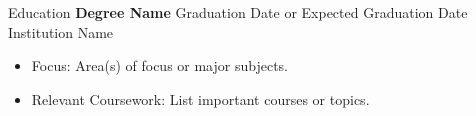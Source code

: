 \begin{rSection}{Education}
  \textbf{Degree Name} \hfill Graduation Date or Expected Graduation Date \\
  Institution Name
  \begin{itemize}
      \item Focus: Area(s) of focus or major subjects.
      \item Relevant Coursework: List important courses or topics.
  \end{itemize}
\end{rSection}
